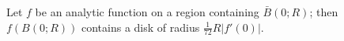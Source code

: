Let $f$ be an analytic function on a region containing $\bar{B}(0; R)$; then $f(B(0; R))$ contains a disk of radius $\frac{1}{72} R|f'(0)|$.